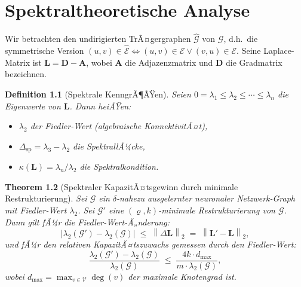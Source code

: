 ﻿\documentclass[12pt, a4paper, openany]{report}
\newtheorem{theorem}{Theorem}[chapter]
\newtheorem{definition}[theorem]{Definition}
\newcommand{\calG}{\mathcal{G}}
\newcommand{\calV}{\mathcal{V}}
\newcommand{\calE}{\mathcal{E}}
\newcommand{\norms}[1]{\left\|#1\right\|}
\newcommand{\abs}[1]{\left|#1\right|}
\begin{document}
\chapter{Spektraltheoretische Analyse}
\label{sec:spectral}

Wir betrachten den undirigierten TrÃ¤gergraphen $\hat{\calG}$ von $\calG$,
d.h.\ die symmetrische Version $(u,v) \in \hat{\calE} \Leftrightarrow
(u,v) \in \calE \lor (v,u) \in \calE$.  Seine Laplace-Matrix ist
$\bm{L} = \bm{D} - \bm{A}$, wobei $\bm{A}$ die Adjazenzmatrix und $\bm{D}$
die Gradmatrix bezeichnen.

\begin{definition}[Spektrale KenngrÃ¶ÃŸen]
\label{def:spectral}
Seien $0 = \lambda_1 \leq \lambda_2 \leq \cdots \leq \lambda_n$ die
Eigenwerte von $\bm{L}$.  Dann heiÃŸen:
\begin{itemize}
  \item $\lambda_2$ der \emph{Fiedler-Wert} (algebraische KonnektivitÃ¤t),
  \item $\Delta_{\mathrm{sp}} = \lambda_3 - \lambda_2$ die \emph{SpektrallÃ¼cke},
  \item $\kappa(\bm{L}) = \lambda_n / \lambda_2$ die \emph{Spektralkondition}.
\end{itemize}
\end{definition}

\begin{theorem}[Spektraler KapazitÃ¤tsgewinn durch minimale Restrukturierung]
\label{thm:spectral}
Sei $\calG$ ein $\delta$-nahezu ausgelernter neuronaler Netzwerk-Graph mit
Fiedler-Wert $\lambda_2$.  Sei $\calG'$ eine $(\varrho, k)$-minimale
Restrukturierung von $\calG$.  Dann gilt fÃ¼r die Fiedler-Wert-Ã„nderung:
\begin{equation}
  \label{eq:fiedler_bound}
  \abs{\lambda_2(\calG') - \lambda_2(\calG)} \;\leq\;
  \norms{\Delta \bm{L}}_2 \;=\; \norms{\bm{L}' - \bm{L}}_2,
\end{equation}
und fÃ¼r den relativen KapazitÃ¤tszuwachs gemessen durch den Fiedler-Wert:
\begin{equation}
  \label{eq:fiedler_relative}
  \frac{\lambda_2(\calG') - \lambda_2(\calG)}{\lambda_2(\calG)}
  \;\leq\;
  \frac{4k \cdot d_{\max}}{m \cdot \lambda_2(\calG)},
\end{equation}
wobei $d_{\max} = \max_{v \in \calV} \deg(v)$ der maximale Knotengrad ist.
\end{theorem}
\end{document}
